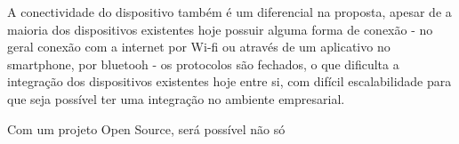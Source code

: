 \documentclass[]{politex}
\begin{document}
A conectividade do dispositivo também é um diferencial na proposta, apesar de a maioria dos dispositivos existentes hoje possuir alguma forma de conexão - no geral conexão com a internet por Wi-fi ou através de um aplicativo no smartphone, por bluetooh - os protocolos são fechados, o que dificulta a integração dos dispositivos existentes hoje entre si, com difícil escalabilidade para que seja possível ter uma integração no ambiente empresarial. 

Com um projeto Open Source, será possível não só 

%

%



\end{document}
